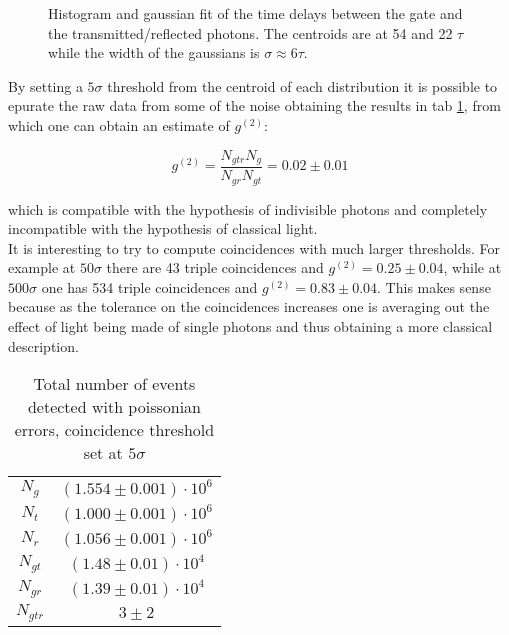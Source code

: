 \documentclass[a4paper, 11pt]{article}
\begin{document}
      \begin{figure}[H]
        \centering
        \caption{Histogram and gaussian fit of the time delays between the gate and the transmitted/reflected photons. The centroids are at 54 and 22 $\tau$ while the width of the gaussians is $\sigma \approx 6 \tau$.}
        \label{fig:delays}
      \end{figure}

      By setting a $5\sigma$ threshold from the centroid of each distribution it is possible to epurate the raw data from some of the noise obtaining the results in tab \ref{tab:coincidences}, from which one can obtain an estimate of $g^{(2)}$:

      \begin{equation*}
        g^{(2)} = \frac{N_{gtr}N_g}{N_{gr}N_{gt}} = 0.02 \pm 0.01
      \end{equation*}

      which is compatible with the hypothesis of indivisible photons and completely incompatible with the hypothesis of classical light.\\
      It is interesting to try to compute coincidences with much larger thresholds. For example at $50 \sigma$ there are 43 triple coincidences and $g^{(2)} = 0.25 \pm 0.04$, while at $500 \sigma$ one has 534 triple coincidences and $g^{(2)} = 0.83 \pm 0.04$. This makes sense because as the tolerance on the coincidences increases one is averaging out the effect of light being made of single photons and thus obtaining a more classical description.

      \begin{table}
        \centering
        \caption{Total number of events detected with poissonian errors, coincidence threshold set at $5\sigma$}
        \label{tab:coincidences}
        \begin{tabular}{cc}
          \toprule
          $N_g$ & $(1.554 \pm 0.001) \cdot 10^6$ \\
          $N_t$ & $(1.000 \pm 0.001) \cdot 10^6$ \\
          $N_r$ & $(1.056 \pm 0.001) \cdot 10^6$ \\
          $N_{gt}$ & $(1.48 \pm 0.01) \cdot 10^4$ \\
          $N_{gr}$ & $(1.39 \pm 0.01) \cdot 10^4$ \\
          $N_{gtr}$ & $3 \pm 2$ \\
          \bottomrule
        \end{tabular}
      \end{table}
\end{document}
